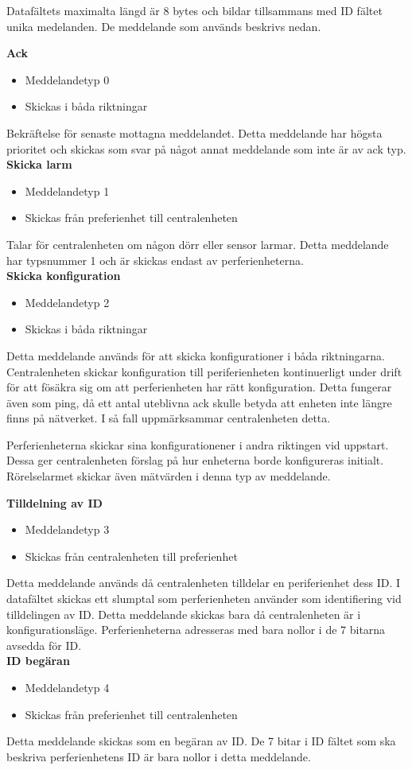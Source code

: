 Datafältets maximalta längd är 8 bytes och bildar tillsammans med ID fältet unika medelanden.
De meddelande som används beskrivs nedan.



\textbf{Ack}
\begin{itemize}
    \item Meddelandetyp 0
    \item Skickas i båda riktningar
\end{itemize}
Bekräftelse för senaste mottagna meddelandet.
Detta meddelande har högsta prioritet och skickas som svar på något annat meddelande som inte är av ack typ. \\


\textbf{Skicka larm}
\begin{itemize}
    \item Meddelandetyp 1
    \item Skickas från preferienhet till centralenheten
\end{itemize}
Talar för centralenheten om någon dörr eller sensor larmar.
Detta meddelande har typsnummer 1 och är skickas endast av perferienheterna. \\


\textbf{Skicka konfiguration}
\begin{itemize}
    \item Meddelandetyp 2
    \item Skickas i båda riktningar
\end{itemize}
Detta meddelande används för att skicka konfigurationer i båda riktningarna.
Centralenheten skickar konfiguration till periferienheten kontinuerligt under drift för att fösäkra sig om att perferienheten har rätt konfiguration.
Detta fungerar även som ping, då ett antal uteblivna ack skulle betyda att enheten inte längre finns på nätverket.
I så fall uppmärksammar centralenheten detta.

Perferienheterna skickar sina konfigurationener i andra riktingen vid uppstart.
Dessa ger centralenheten förslag på hur enheterna borde konfigureras initialt. Rörelselarmet skickar även mätvärden i denna typ av meddelande.


\textbf{Tilldelning av ID}
\begin{itemize}
    \item Meddelandetyp 3
    \item Skickas från centralenheten till preferienhet
\end{itemize}
Detta meddelande används då centralenheten tilldelar en periferienhet dess ID.
I datafältet skickas ett slumptal som perferienheten använder som identifiering vid tilldelingen av ID.
Detta meddelande skickas bara då centralenheten är i konfigurationsläge.
Perferienheterna adresseras med bara nollor i de 7 bitarna avsedda för ID. \\


\textbf{ID begäran}
\begin{itemize}
    \item Meddelandetyp 4
    \item Skickas från preferienhet till centralenheten
\end{itemize}
Detta meddelande skickas som en begäran av ID.
De 7 bitar i ID fältet som ska beskriva perferienhetens ID är bara nollor i detta meddelande.
